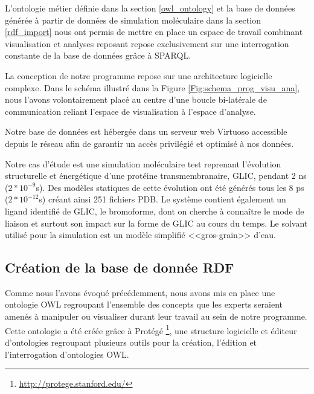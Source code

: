 L'ontologie métier définie dans la section \ref{owl_ontology} et la base de données générée à partir de données de simulation moléculaire dans la section \ref{rdf_import} nous ont permis de mettre en place un espace de travail combinant visualisation et analyses reposant repose exclusivement sur une interrogation constante de la base de données grâce à SPARQL.

La conception de notre programme repose sur une architecture logicielle complexe. Dans le schéma illustré dans la Figure \ref{Fig:schema_prog_visu_ana}, nous l'avons volontairement placé au centre d'une boucle bi-latérale de communication reliant l'espace de visualisation à l'espace d'analyse.

Notre base de données est hébergée dans un serveur web Virtuoso accessible depuis le réseau afin de garantir un accès privilégié et optimisé à nos données. 

Notre cas d'étude est une simulation moléculaire test reprenant l'évolution structurelle et énergétique d'une protéine transmembranaire, GLIC, pendant 2 ns ($2*10^{-9}$s). Des modèles statiques de cette évolution ont été générés tous les 8 ps ($2*10^{-12}$s) créant ainsi 251 fichiers PDB. Le système contient également un ligand identifié de GLIC, le bromoforme, dont on cherche à connaître le mode de liaison et surtout son impact sur la forme de GLIC au cours du temps. Le solvant utilisé pour la simulation est un modèle simplifié <<gros-grain>> d'eau.

\subsection{Création de la base de donnée RDF}

Comme nous l'avons évoqué précédemment, nous avons mis en place une ontologie OWL regroupant l'ensemble des concepts que les experts seraient amenés à manipuler ou visualiser durant leur travail au sein de notre programme. Cette ontologie a été créée grâce à Protégé \footnote{\url{http://protege.stanford.edu/}}, une structure logicielle et éditeur d'ontologies regroupant plusieurs outils pour la création, l'édition et l'interrogation d'ontologies OWL.

